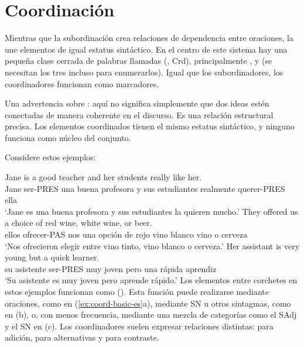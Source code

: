 \section{Coordinación}\label{sec:coordination-es}

Mientras que la subordinación crea relaciones de dependencia entre oraciones, la  une elementos de igual estatus sintáctico. En el centro de este sistema hay una pequeña clase cerrada de palabras llamadas  (, Crd), principalmente ,  y  (se necesitan los tres incluso para enumerarlos). Igual que los subordinadores, los coordinadores funcionan como marcadores.

Una advertencia sobre : aquí no significa simplemente que dos ideas estén conectadas de manera coherente en el discurso. Es una relación estructural precisa. Los elementos coordinados tienen el mismo estatus sintáctico, y ninguno funciona como núcleo del conjunto.

Considere estos ejemplos:

\ea \label{ex:coord-basic-es}
    \ea \gll {\ob}Jane is a good teacher{\cb} {\ob}and her students really like her{\cb}.\\
        Jane ser-PRES una buena profesora y sus estudiantes realmente querer-PRES ella\\
    \glt `Jane es una buena profesora y sus estudiantes la quieren mucho.'
    \ex \gll They offered us a choice of {\ob}red wine{\cb}, {\ob}white wine{\cb}, {\ob}or beer{\cb}.\\
        ellos ofrecer-PAS nos una opción de rojo vino blanco vino o cerveza\\
    \glt `Nos ofrecieron elegir entre vino tinto, vino blanco o cerveza.'
    \ex \gll Her assistant is {\ob}very young{\cb} {\ob}but a quick learner{\cb}.\\
        su asistente ser-PRES muy joven pero una rápida aprendiz\\
    \glt `Su asistente es muy joven pero aprende rápido.'
    \z
\z
Los elementos entre corchetes en estos ejemplos funcionan como  (). Esta función puede realizarse mediante oraciones, como en (\ref{ex:coord-basic-es}a), mediante SN u otros sintagmas, como en (b), o, con menos frecuencia, mediante una mezcla de categorías como el SAdj y el SN en (c). Los coordinadores suelen expresar relaciones distintas:  para adición,  para alternativas y  para contraste.

